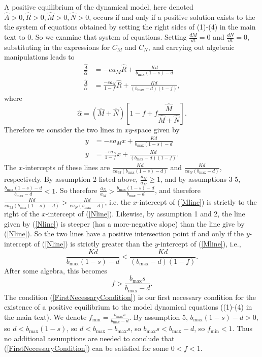 \documentclass[letterpaper,11pt]{article}
\newcommand{\hA}{\hat{A}}
\newcommand{\hR}{\hat{R}}
\newcommand{\hM}{\hat{M}}
\newcommand{\hN}{\hat{N}}
\newcommand{\halph}{\hat{\alpha}}
\newcommand{\bmax}{b_{\text{max}}}
\newcommand{\fmin}{f_{\text{min}}}
\begin{document}
\noindent A positive equilibrium of the dynamical model, here denoted $\hA>0,\hR>0,\hM>0,\hN>0$, occurs if and only if
a positive solution exists to the the system of equations obtained by setting the right sides of (1)-(4)
in the main text to $0$. So we examine that system of equations. 
Setting $\frac{dM}{dt}=0$ and $\frac{dN}{dt}=0$, substituting in the expressions for $C_M$ and $C_N$, and carrying out
algebraic manipulations leads to
\begin{align}
\frac{\hA}{\halph} &= -ea_M \hR +\frac{Kd}{\bmax (1-s)-d} \\
\frac{\hA}{\halph} &= \frac{-ea_N}{1-f}\hR +\frac{Kd}{(\bmax-d)(1-f)},
\end{align}
where
\begin{equation}
\halph=(\hM+\hN)\left[1-f+f\frac{\hM}{\hM+\hN} \right].
\end{equation}
Therefore we consider the two lines in $xy$-space given by
\begin{align}
y &= -ea_M x +\frac{Kd}{\bmax (1-s)-d} \label{Mline}\\
y &= \frac{-ea_N}{1-f}x +\frac{Kd}{(\bmax-d)(1-f)}. \label{Nline}
\end{align}
The $x$-intercepts of these lines are $\frac{Kd}{ea_M(\bmax(1-s)-d)}$ and
$\frac{Kd}{ea_N(\bmax-d)}$, respectively. By assumption 2 listed above, $\frac{a_N}{a_M}\geq1$, and by assumptions 3-5,
$\frac{\bmax(1-s)-d}{\bmax-d}<1$. So therefore $\frac{a_N}{a_M}>\frac{\bmax(1-s)-d}{\bmax-d}$, and
therefore $\frac{Kd}{ea_M(\bmax(1-s)-d)}>\frac{Kd}{ea_N(\bmax-d)}$, i.e. the $x$-intercept of (\ref{Mline})
is strictly to the right of the $x$-intercept of (\ref{Nline}). Likewise, by assumption 1 and 2, the line given by
(\ref{Nline}) is steeper (has a more-negative slope) than the line give by (\ref{Nline}). So the two lines have a
positive intersection point if and only if the $y$-intercept of (\ref{Nline}) is strictly greater than the
$y$-intercept of (\ref{Mline}), i.e.,
\begin{equation}
\frac{Kd}{\bmax(1-s)-d}<\frac{Kd}{(\bmax-d)(1-f)}.
\end{equation}
After some algebra, this becomes
\begin{equation}
f>\frac{\bmax s}{\bmax-d}.\label{FirstNecessaryCondition}
\end{equation}
The condition (\ref{FirstNecessaryCondition}) is our first necessary condition for the existence of a positive equilibrium to
the model dynamical equations ((1)-(4) in the main text). We denote $\fmin=\frac{\bmax s}{\bmax-d}$. By assumption 5,
$\bmax(1-s)-d>0$, so $d<\bmax(1-s)$, so $d<\bmax-\bmax s$, so $\bmax s < \bmax - d$, so $\fmin<1$. Thus no additional assumptions
are needed to conclude that (\ref{FirstNecessaryCondition}) can be satisfied for some $0<f<1$.
\end{document}
